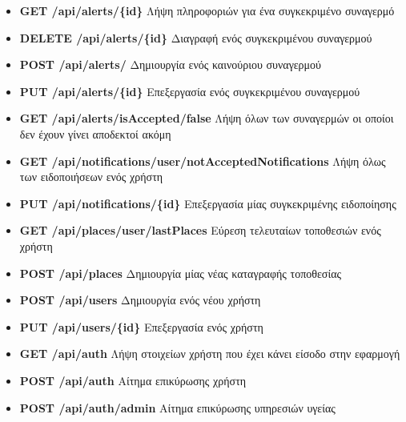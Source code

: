 \begin{itemize}
\item \textbf{GET /api/alerts/\{id\}}  \newline
Λήψη πληροφοριών για ένα συγκεκριμένο συναγερμό

\item \textbf{DELETE /api/alerts/\{id\}}  \newline
Διαγραφή ενός συγκεκριμένου συναγερμού

\item \textbf{POST /api/alerts/} \newline
Δημιουργία ενός καινούριου συναγερμού

\item \textbf{PUT /api/alerts/\{id\}}  \newline
Eπεξεργασία ενός συγκεκριμένου συναγερμού

\item \textbf{GET /api/alerts/isAccepted/false} \newline
Λήψη όλων των συναγερμών οι οποίοι δεν έχουν γίνει αποδεκτοί ακόμη

\item \textbf{GET /api/notifications/user/notAcceptedNotifications} \newline
Λήψη όλως των ειδοποιήσεων ενός χρήστη

\item \textbf{PUT /api/notifications/\{id\}} \newline
Επεξεργασία μίας συγκεκριμένης ειδοποίησης

\item \textbf{GET /api/places/user/lastPlaces} \newline
Εύρεση τελευταίων τοποθεσιών ενός χρήστη

\item \textbf{POST /api/places} \newline
Δημιουργία μίας νέας καταγραφής τοποθεσίας

\item \textbf{POST /api/users} \newline
Δημιουργία ενός νέου χρήστη

\item \textbf{PUT /api/users/\{id\}} \newline
Επεξεργασία ενός χρήστη

\item \textbf{GET /api/auth} \newline
Λήψη στοιχείων χρήστη που έχει κάνει είσοδο στην εφαρμογή

\item \textbf{POST /api/auth} \newline
Αίτημα επικύρωσης χρήστη

\item \textbf{POST /api/auth/admin} \newline
Αίτημα επικύρωσης υπηρεσιών υγείας
\end{itemize}

